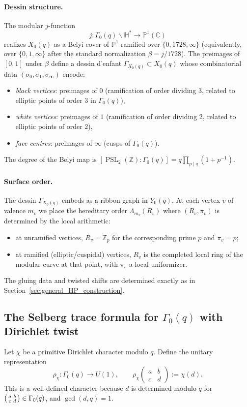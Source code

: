 \documentclass[11pt,oneside]{amsbook}
\numberwithin{equation}{section}
\theoremstyle{plain}
\theoremstyle{definition}
\theoremstyle{remark}
\newcommand{\PP}{\mathbb{P}}
\newcommand{\HH}{\mathbb{H}}
\newcommand{\Z}{\mathbb{Z}}
\newcommand{\C}{\mathbb{C}}
\DeclareMathOperator{\PSL}{\mathrm{PSL}}
\begin{document}
\paragraph{Dessin structure.}
The modular $j$-function
\[
j:\Gamma_0(q)\backslash\HH^\ast\to \PP^1(\C)
\]
realizes $X_0(q)$ as a Belyi cover of $\PP^1$ ramified over $\{0,1728,\infty\}$ (equivalently, over $\{0,1,\infty\}$ after the standard normalization $\beta=j/1728$).
The preimages of $[0,1]$ under $\beta$ define a dessin d'enfant $\Gamma_{X_0(q)}\subset X_0(q)$ whose combinatorial data $(\sigma_0,\sigma_1,\sigma_\infty)$ encode:
\begin{itemize}
\item \emph{black vertices}: preimages of $0$ (ramification of order dividing $3$, related to elliptic points of order $3$ in $\Gamma_0(q)$),
\item \emph{white vertices}: preimages of $1$ (ramification of order dividing $2$, related to elliptic points of order $2$),
\item \emph{face centres}: preimages of $\infty$ (cusps of $\Gamma_0(q)$).
\end{itemize}
The degree of the Belyi map is $[\PSL_2(\Z):\Gamma_0(q)]=q\prod_{p\mid q}(1+p^{-1})$.

\paragraph{Surface order.}
The dessin $\Gamma_{X_0(q)}$ embeds as a ribbon graph in $Y_0(q)$.
At each vertex $v$ of valence $m_v$ we place the hereditary order $\Lambda_{m_v}(R_v)$ where $(R_v,\pi_v)$ is determined by the local arithmetic:
\begin{itemize}
\item at unramified vertices, $R_v=\Z_p$ for the corresponding prime $p$ and $\pi_v=p$;
\item at ramified (elliptic/cuspidal) vertices, $R_v$ is the completed local ring of the modular curve at that point, with $\pi_v$ a local uniformizer.
\end{itemize}
The gluing data and twisted shifts are determined exactly as in Section~\ref{sec:general_HP_construction}.

\subsection{The Selberg trace formula for $\Gamma_0(q)$ with Dirichlet twist}
\label{sec:selberg_trace_dirichlet}

Let $\chi$ be a primitive Dirichlet character modulo $q$.
Define the unitary representation
\begin{equation}
\label{eq:rho_chi_definition}
\rho_\chi:\Gamma_0(q)\to U(1),\qquad
\rho_\chi\!\begin{pmatrix}a&b\\c&d\end{pmatrix}:=\chi(d).
\end{equation}
This is a well-defined character because $d$ is determined modulo $q$ for $\begin{psmallmatrix}a&b\\c&d\end{psmallmatrix}\in\Gamma_0(q)$, and $\gcd(d,q)=1$.
\end{document}
